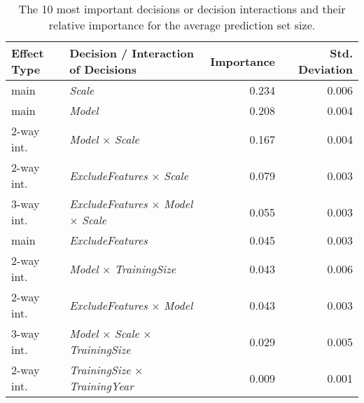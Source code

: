 \begin{table}
\centering
\caption{The 10 most important decisions or decision interactions and their relative importance for the average prediction set size.}
\label{tab:fanova_top10}
\begin{tabular}{llrr}
\toprule
Effect Type &                                      Decision / Interaction of Decisions &  Importance &  Std. Deviation \\
\midrule
       main &                                                           \textit{Scale} &       0.234 &           0.006 \\
       main &                                                           \textit{Model} &       0.208 &           0.004 \\
 2-way int. &                                   \textit{Model} $\times$ \textit{Scale} &       0.167 &           0.004 \\
 2-way int. &                         \textit{ExcludeFeatures} $\times$ \textit{Scale} &       0.079 &           0.003 \\
 3-way int. & \textit{ExcludeFeatures} $\times$ \textit{Model} $\times$ \textit{Scale} &       0.055 &           0.003 \\
       main &                                                 \textit{ExcludeFeatures} &       0.045 &           0.003 \\
 2-way int. &                            \textit{Model} $\times$ \textit{TrainingSize} &       0.043 &           0.006 \\
 2-way int. &                         \textit{ExcludeFeatures} $\times$ \textit{Model} &       0.043 &           0.003 \\
 3-way int. &    \textit{Model} $\times$ \textit{Scale} $\times$ \textit{TrainingSize} &       0.029 &           0.005 \\
 2-way int. &                     \textit{TrainingSize} $\times$ \textit{TrainingYear} &       0.009 &           0.001 \\
\bottomrule
\end{tabular}
\end{table}
